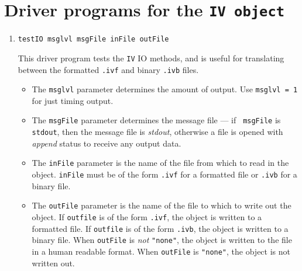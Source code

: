 \par
\section{Driver programs for the {\tt IV object}}
\label{section:IV:drivers}
\par
\begin{enumerate}
\item
\begin{verbatim}
testIO msglvl msgFile inFile outFile
\end{verbatim}
This driver program tests the {\tt IV} IO methods,
and is useful for translating between the formatted {\tt *.ivf}
and binary {\tt *.ivb} files.
\par
\begin{itemize}
\item
The {\tt msglvl} parameter determines the amount of output.
Use {\tt msglvl = 1} for just timing output.
\item
The {\tt msgFile} parameter determines the message file --- if {\tt
msgFile} is {\tt stdout}, then the message file is {\it stdout},
otherwise a file is opened with {\it append} status to receive any
output data.
\item
The {\tt inFile} parameter is the name of the file 
from which to read in the object.
{\tt inFile} must be of the form {\tt *.ivf} for a formatted file
or {\tt *.ivb} for a binary file.
\item
The {\tt outFile} parameter is the name of the file 
to which to write out the object.
If {\tt outfile} is of the form {\tt *.ivf}, the object is written
to a formatted file.
If {\tt outfile} is of the form {\tt *.ivb}, the object is written
to a binary file.
When {\tt outFile} is {\it not} {\tt "none"}, 
the object is written to the file in a human readable format.
When {\tt outFile} is {\tt "none"}, the object is not written out.
\end{itemize}
\end{enumerate}
